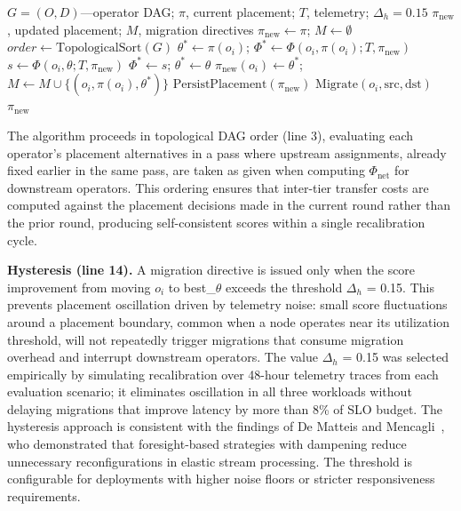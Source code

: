 \documentclass[preprint,review,12pt]{elsarticle}
\begin{document}
\begin{algorithm}[htbp]
\caption{AODE Placement Recalibration}
\label{alg:recalibration}
\begin{algorithmic}[1]
\REQUIRE $G = (O, D)$—operator DAG; $\pi$, current placement; $T$, telemetry; $\Delta_h = 0.15$
\ENSURE $\pi_{\text{new}}$, updated placement; $M$, migration directives
\STATE $\pi_{\text{new}} \leftarrow \pi$; $M \leftarrow \emptyset$
\STATE $\textit{order} \leftarrow \text{TopologicalSort}(G)$
    \STATE $\theta^* \leftarrow \pi(o_i)$; $\Phi^* \leftarrow \Phi(o_i, \pi(o_i); T, \pi_{\text{new}})$
            \STATE $s \leftarrow \Phi(o_i, \theta; T, \pi_{\text{new}})$
                \STATE $\Phi^* \leftarrow s$; $\theta^* \leftarrow \theta$
            \ENDIF
        \ENDIF
    \ENDFOR
        \STATE $\pi_{\text{new}}(o_i) \leftarrow \theta^*$; $M \leftarrow M \cup \{(o_i, \pi(o_i), \theta^*)\}$
    \ENDIF
\ENDFOR
\STATE $\text{PersistPlacement}(\pi_{\text{new}})$
    \STATE $\text{Migrate}(o_i, \text{src}, \text{dst})$
\ENDFOR
\RETURN $\pi_{\text{new}}$
\end{algorithmic}
\end{algorithm}


The algorithm proceeds in topological DAG order (line 3), evaluating each operator's placement alternatives in a pass where upstream assignments, already fixed earlier in the same pass, are taken as given when computing $\Phi_{\text{net}}$ for downstream operators. This ordering ensures that inter-tier transfer costs are computed against the placement decisions made in the current round rather than the prior round, producing self-consistent scores within a single recalibration cycle.

\textbf{Hysteresis (line 14).} A migration directive is issued only when the score improvement from moving $o_i$ to best\_$\theta$ exceeds the threshold $\Delta_h$ = 0.15. This prevents placement oscillation driven by telemetry noise: small score fluctuations around a placement boundary, common when a node operates near its utilization threshold, will not repeatedly trigger migrations that consume migration overhead and interrupt downstream operators. The value $\Delta_h$ = 0.15 was selected empirically by simulating recalibration over 48-hour telemetry traces from each evaluation scenario; it eliminates oscillation in all three workloads without delaying migrations that improve latency by more than 8\% of SLO budget. The hysteresis approach is consistent with the findings of De Matteis and Mencagli~\cite{dematteis2017elastic}, who demonstrated that foresight-based strategies with dampening reduce unnecessary reconfigurations in elastic stream processing. The threshold is configurable for deployments with higher noise floors or stricter responsiveness requirements.
\end{document}
